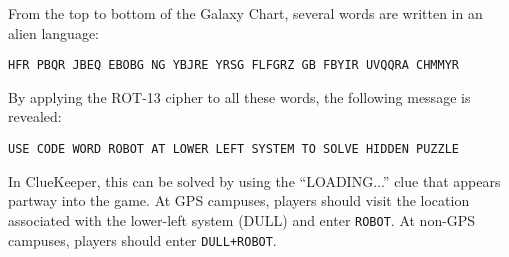 From the top to bottom of the Galaxy Chart, several words are written in an
alien language:

\texttt{HFR PBQR JBEQ EBOBG NG YBJRE YRSG FLFGRZ GB FBYIR UVQQRA CHMMYR}

By applying the ROT-13 cipher to all these words, the following message
is revealed:

\texttt{USE CODE WORD ROBOT AT LOWER LEFT SYSTEM TO SOLVE HIDDEN PUZZLE}

In ClueKeeper, this can be solved by using the ``LOADING...'' clue that
appears partway into the game. At GPS campuses, players should visit the
location associated with the lower-left system (DULL) and enter \texttt{ROBOT}.
At non-GPS campuses, players should enter \texttt{DULL+ROBOT}. 
